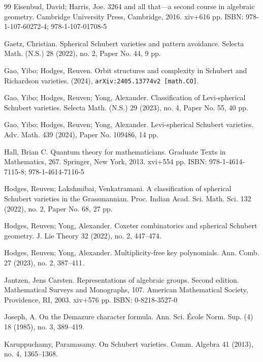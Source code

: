 \documentclass[12pt]{amsart}
\theoremstyle{definition}
\theoremstyle{remark}
\begin{document}
\begin{thebibliography}{99}
Eisenbud, David; Harris, Joe. 3264 and all that—a second course in algebraic geometry. Cambridge University Press, Cambridge, 2016. xiv+616 pp. ISBN: 978-1-107-60272-4; 978-1-107-01708-5

Gaetz, Christian. Spherical Schubert varieties and pattern avoidance. Selecta Math. (N.S.) 28 (2022), no. 2, Paper No. 44, 9 pp.

Gao, Yibo; Hodges, Reuven. Orbit structures and complexity in Schubert and Richardson varieties. (2024), \texttt{arXiv:2405.13774v2 [math.CO]}.

Gao, Yibo; Hodges, Reuven; Yong, Alexander. Classification of Levi-spherical Schubert varieties. Selecta Math. (N.S.) 29 (2023), no. 4, Paper No. 55, 40 pp.

Gao, Yibo; Hodges, Reuven; Yong, Alexander. Levi-spherical Schubert varieties. Adv. Math. 439 (2024), Paper No. 109486, 14 pp.

Hall, Brian C. Quantum theory for mathematicians. Graduate Texts in Mathematics, 267. Springer, New York, 2013. xvi+554 pp. ISBN: 978-1-4614-7115-8; 978-1-4614-7116-5

Hodges, Reuven; Lakshmibai, Venkatramani. A classification of spherical Schubert varieties in the Grassmannian. Proc. Indian Acad. Sci. Math. Sci. 132 (2022), no. 2, Paper No. 68, 27 pp.

Hodges, Reuven; Yong, Alexander. Coxeter combinatorics and spherical Schubert geometry. J. Lie Theory 32 (2022), no. 2, 447--474.

Hodges, Reuven; Yong, Alexander. Multiplicity-free key polynomials. Ann. Comb. 27 (2023), no. 2, 387--411.

Jantzen, Jens Carsten. Representations of algebraic groups. Second edition. Mathematical Surveys and Monographs, 107. American Mathematical Society, Providence, RI, 2003. xiv+576 pp. ISBN: 0-8218-3527-0

Joseph, A. On the Demazure character formula. Ann. Sci. {\'E}cole Norm. Sup. (4) 18 (1985), no. 3, 389--419.

Karuppuchamy, Paramasamy. On Schubert varieties. Comm. Algebra 41 (2013), no. 4, 1365--1368.


\end{thebibliography}
\end{document}
